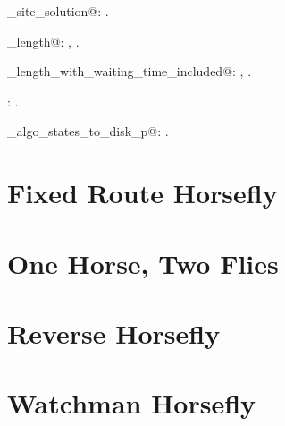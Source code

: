 \documentclass[11.5pt]{report}
\begin{document}
{\begin{list}{}{\setlength{\itemsep}{-\parsep}\setlength{\itemindent}{-\leftmargin}}
\item \verb@single_site_solution@: \underline{}.
\item \verb@tour_length@: , \underline{}.
\item \verb@tour_length_with_waiting_time_included@: , \underline{}.
\item \verb@wrapperkeyPressHandler@: \underline{}.
\item \verb@write_algo_states_to_disk_p@: \underline{}.
\end{list}} 


\label{chap:segment-horsefly}\chapter{Fixed Route Horsefly}
\label{chap:fixed-route-horsefly}\chapter{One Horse, Two Flies}
\label{chap:one-horse-two-flies}
\chapter{Reverse Horsefly}
\label{chap:reverse-horsefly}\chapter{Watchman Horsefly}
\label{watchman-horsefly}
\end{document}
